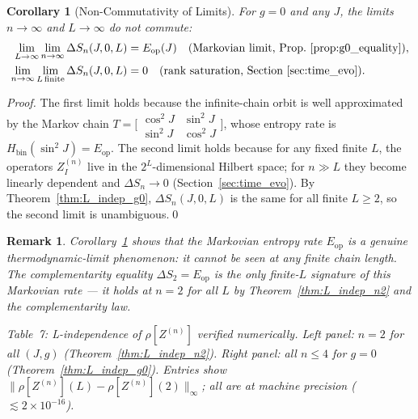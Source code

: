 \documentclass[12pt,a4paper]{article}
\newtheorem{corollary}[theorem]{Corollary}
\newtheorem{remark}[theorem]{Remark}
\begin{document}
\begin{corollary}[Non-Commutativity of Limits]\label{cor:noncomm}
For $g=0$ and any $J$, the limits $n\to\infty$ and $L\to\infty$ do not commute:
\begin{align}
  \lim_{L\to\infty}\lim_{n\to\infty}\Delta S_n(J,0,L) &= E_\mathrm{op}(J)
    \quad\text{(Markovian limit, Prop.~\ref{prop:g0_equality})},\\
  \lim_{n\to\infty}\lim_{L\,\text{finite}}\Delta S_n(J,0,L) &= 0
    \quad\text{(rank saturation, Section~\ref{sec:time_evo})}.
\end{align}
\end{corollary}

\begin{proof}
The first limit holds because the infinite-chain orbit is well approximated by the
Markov chain $T = \bigl[\begin{smallmatrix}\cos^2\!J&\sin^2\!J\\\sin^2\!J&\cos^2\!J\end{smallmatrix}\bigr]$,
whose entropy rate is $H_\mathrm{bin}(\sin^2\!J) = E_\mathrm{op}$.
The second limit holds because for any fixed finite $L$, the operators $Z^{(n)}_I$
live in the $2^L$-dimensional Hilbert space; for $n\gg L$ they become linearly
dependent and $\Delta S_n\to 0$ (Section~\ref{sec:time_evo}).
By Theorem~\ref{thm:L_indep_g0}, $\Delta S_n(J,0,L)$ is the same for all finite
$L\ge 2$, so the second limit is unambiguous.\qed
\end{proof}

\begin{remark}
Corollary~\ref{cor:noncomm} shows that the Markovian entropy rate $E_\mathrm{op}$
is a genuine thermodynamic-limit phenomenon: it cannot be seen at any finite chain
length.  The complementarity equality $\Delta S_2 = E_\mathrm{op}$ is the only
\emph{finite-$L$} signature of this Markovian rate — it holds at $n=2$ for all
$L$ by Theorem~\ref{thm:L_indep_n2} and the complementarity law.
\end{remark}

\noindent\textit{Table~7: L-independence of $\rho[Z^{(n)}]$ verified numerically.
Left panel: $n=2$ for all $(J,g)$ (Theorem~\ref{thm:L_indep_n2}).
Right panel: all $n\le 4$ for $g=0$ (Theorem~\ref{thm:L_indep_g0}).
Entries show $\|\rho[Z^{(n)}](L)-\rho[Z^{(n)}](2)\|_\infty$; all are at machine
precision ($\lesssim 2\times10^{-16}$).}
\end{document}
